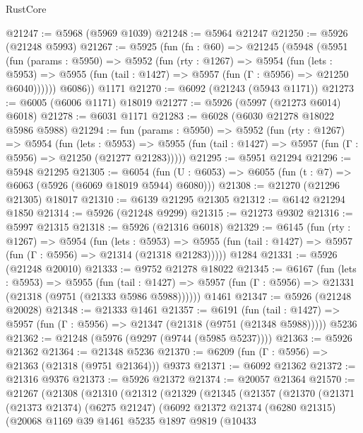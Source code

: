 \begin{lexlean}{RustCore}
\begin{coremodule}
@21247 := @5968 (@5969 @1039)
@21248 := @5964 @21247
@21250 := @5926 (@21248 @5993)
@21267 := @5925
    (fun (fn : @60) =>
    @21245
      (@5948
        (@5951
          (fun (params : @5950) =>
          @5952
            (fun (rty : @1267) =>
            @5954
              (fun (lets : @5953) =>
              @5955 (fun (tail : @1427) => @5957 (fun (Γ : @5956) => @21250 @6040))))))
        @6086))
    @1171
@21270 := @6092 (@21243 (@5943 @1171))
@21273 := @6005 (@6006 @1171) @18019
@21277 := @5926 (@5997 (@21273 @6014) @6018)
@21278 := @6031 @1171
@21283 := @6028 (@6030 @21278 @18022 @5986 @5988)
@21294 := fun (params : @5950) =>
  @5952
    (fun (rty : @1267) =>
    @5954
      (fun (lets : @5953) =>
      @5955 (fun (tail : @1427) => @5957 (fun (Γ : @5956) => @21250 (@21277 @21283)))))
@21295 := @5951 @21294
@21296 := @5948 @21295
@21305 := @6054
    (fun (U : @6053) => @6055 (fun (t : @7) => @6063 (@5926 (@6069 @18019 @5944) @6080)))
@21308 := @21270 (@21296 @21305) @18017
@21310 := @6139 @21295 @21305
@21312 := @6142 @21294 @1850
@21314 := @5926 (@21248 @9299)
@21315 := @21273 @9302
@21316 := @5997 @21315
@21318 := @5926 (@21316 @6018)
@21329 := @6145
    (fun (rty : @1267) =>
    @5954
      (fun (lets : @5953) =>
      @5955 (fun (tail : @1427) => @5957 (fun (Γ : @5956) => @21314 (@21318 @21283)))))
    @1284
@21331 := @5926 (@21248 @20010)
@21333 := @9752 @21278 @18022
@21345 := @6167
    (fun (lets : @5953) =>
    @5955
      (fun (tail : @1427) =>
      @5957 (fun (Γ : @5956) => @21331 (@21318 (@9751 (@21333 @5986 @5988))))))
    @1461
@21347 := @5926 (@21248 @20028)
@21348 := @21333 @1461
@21357 := @6191
    (fun (tail : @1427) => @5957 (fun (Γ : @5956) => @21347 (@21318 (@9751 (@21348 @5988)))))
    @5236
@21362 := @21248 (@5976 (@9297 (@9744 (@5985 @5237))))
@21363 := @5926 @21362
@21364 := @21348 @5236
@21370 := @6209 (fun (Γ : @5956) => @21363 (@21318 (@9751 @21364))) @9373
@21371 := @6092 @21362
@21372 := @21316 @9376
@21373 := @5926 @21372
@21374 := @20057 @21364
@21570 := @21267
    (@21308
      (@21310
        (@21312
          (@21329
            (@21345
              (@21357
                (@21370
                  (@21371
                    (@21373 @21374)
                    (@6275 @21247)
                    (@6092
                      @21372
                      @21374
                      (@6280 @21315)
                      (@20068
                        @1169
                        @39
                        @1461
                        @5235
                        @1897
                        @9819
                        (@10433

\end{coremodule}
\end{lexlean}
